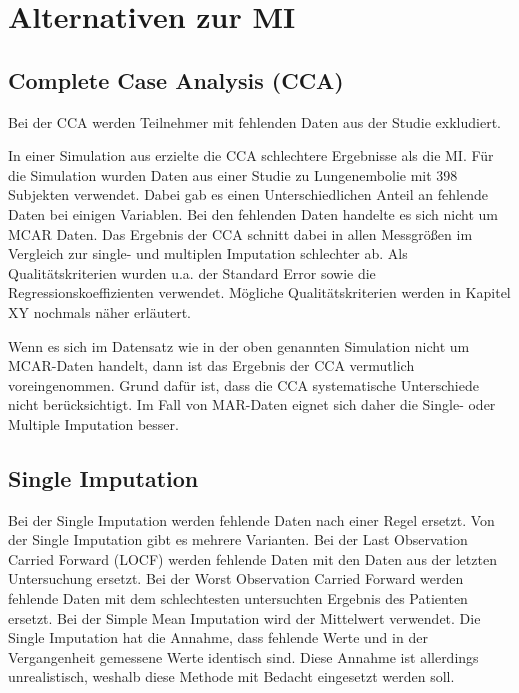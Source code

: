 \section{Alternativen zur MI}
\label{section:alternatives}

\subsection{Complete Case Analysis (CCA)}

Bei der CCA werden Teilnehmer mit fehlenden Daten aus der Studie exkludiert. \autocite[3]{Jakobsen2017} 

In einer Simulation aus \textcite[]{VanderHeijden2006} erzielte die CCA schlechtere Ergebnisse als die MI. Für 
die Simulation wurden Daten aus einer Studie zu Lungenembolie mit 398 Subjekten verwendet. Dabei gab es 
einen Unterschiedlichen Anteil an fehlende Daten bei einigen Variablen. Bei den fehlenden Daten handelte es 
sich nicht um MCAR Daten.  Das Ergebnis der CCA schnitt dabei in allen Messgrößen im Vergleich zur single- 
und multiplen Imputation schlechter ab. Als Qualitätskriterien wurden u.a. der Standard Error sowie die 
Regressionskoeffizienten verwendet. Mögliche Qualitätskriterien werden in Kapitel XY nochmals näher erläutert.

Wenn es sich im Datensatz wie in der oben genannten Simulation nicht um MCAR-Daten handelt, dann ist das Ergebnis der 
CCA vermutlich voreingenommen. Grund dafür ist, dass die CCA systematische Unterschiede nicht 
berücksichtigt. \autocite[157]{Sterne2009} Im Fall von MAR-Daten eignet sich daher die Single- oder Multiple 
Imputation besser. \autocite[1088]{Donders2006}


\subsection{Single Imputation}

Bei der Single Imputation werden fehlende Daten nach einer Regel ersetzt. Von der Single Imputation gibt es mehrere 
Varianten. Bei der Last Observation Carried Forward (LOCF) werden fehlende Daten mit den Daten aus der letzten 
Untersuchung ersetzt. Bei der Worst Observation Carried Forward werden fehlende Daten mit dem schlechtesten untersuchten 
Ergebnis des Patienten ersetzt. Bei der Simple Mean Imputation wird der Mittelwert verwendet. Die Single Imputation hat 
die Annahme, dass fehlende Werte und in der Vergangenheit gemessene Werte identisch sind. Diese Annahme ist allerdings 
unrealistisch, weshalb diese Methode mit Bedacht eingesetzt werden soll.
\autocite[3]{Jakobsen2017}

